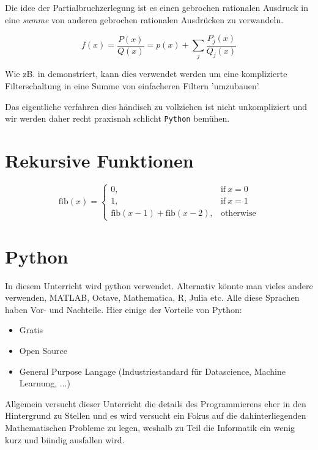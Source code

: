 Die idee der Partialbruchzerlegung ist es einen gebrochen rationalen Ausdruck in eine \emph{summe} von anderen gebrochen rationalen Ausdrücken zu verwandeln. 

\begin{equation}
{\displaystyle {f(x) = \frac {P(x)}{Q(x)}}=p(x)+\sum _{j}{\frac {P_{j}(x)}{Q_{j}(x)}}}
\end{equation}

Wie zB. in \citep{freeman2011} demonstriert, kann dies verwendet werden um eine komplizierte Filterschaltung in eine Summe von einfacheren Filtern 'umzubauen'.

Das eigentliche verfahren dies händisch zu vollziehen ist nicht unkompliziert und wir werden daher recht praxisnah schlicht \texttt{Python} bemühen.

\section{Rekursive Funktionen}
\begin{equation}
	 \displaystyle \mathrm{fib}(x) = \left\{ \begin{array}{ll} 0, & \mathrm{if} \ x = 0 \\ 1, & \mathrm{if} \ x = 1 \\ \mathrm{fib} \mathopen{}\left( x - 1 \mathclose{}\right) + \mathrm{fib} \mathopen{}\left( x - 2 \mathclose{}\right), & \mathrm{otherwise} \end{array} \right. \label{eq:fib}
\end{equation}

\section{Python}\label{sec:python}

In diesem Unterricht wird python verwendet. Alternativ könnte man vieles andere verwenden, MATLAB, Octave,  Mathematica, R, Julia etc. Alle diese Sprachen haben Vor- und Nachteile. Hier einige der Vorteile von Python:
\begin{itemize}
	\item Gratis
	\item Open Source
	\item General Purpose Langage (Industriestandard für Datascience, Machine Learnung, ...) 
\end{itemize}
Allgemein versucht dieser Unterricht die details des Programmierens eher in den Hintergrund zu Stellen und es wird versucht ein Fokus auf die dahinterliegenden Mathematischen Probleme zu legen, weshalb zu Teil die Informatik ein wenig kurz und bündig ausfallen wird. 

